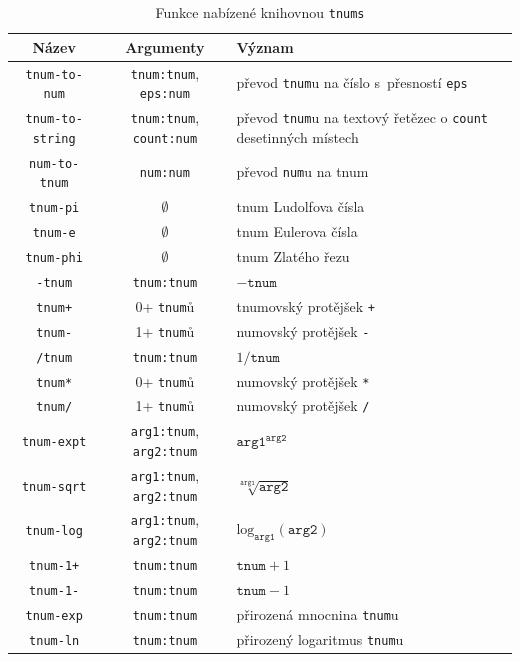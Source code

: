 \begin{table}[H]
\begin{mdframed}[backgroundcolor=lightpink,innertopmargin=-2.5pt,innerbottommargin=2.5pt]
\centering
\caption{Funkce nabízené knihovnou \texttt{tnums}}
\label{tab:funkce_rozhrani}
\begin{tabular}{| >{\columncolor[gray]{1}} c |>{\columncolor[gray]{1}}c|>{\columncolor[gray]{1}}p{4.8cm}|}
\hline
Název & Argumenty & Význam\\ \hline \hline
\texttt{tnum-to-num} & \texttt{tnum:tnum}, \texttt{eps:num} & převod \texttt{tnum}u na číslo s~přesností \texttt{eps}\\
\texttt{tnum-to-string} & \texttt{tnum:tnum}, \texttt{count:num} & převod \texttt{tnum}u na textový řetězec o \texttt{count} desetinných místech\\\hline
\texttt{num-to-tnum}&\texttt{num:num}&převod \texttt{num}u na tnum\\
\texttt{tnum-pi}&$\emptyset$&tnum Ludolfova čísla\\
\texttt{tnum-e}&$\emptyset$&tnum Eulerova čísla\\
\texttt{tnum-phi}&$\emptyset$&tnum Zlatého řezu\\\hline
\texttt{-tnum}&\texttt{tnum:tnum}&$-\texttt{tnum}$\\
\texttt{tnum+}&0+ \texttt{tnum}ů&tnumovský protějšek \texttt{+}\\
\texttt{tnum-}&1+ \texttt{tnum}ů&numovský protějšek \texttt{-}\\
\texttt{/tnum}&\texttt{tnum:tnum}&$1/\texttt{tnum}$\\
\texttt{tnum*}&0+ \texttt{tnum}ů&numovský protějšek \texttt{*}\\
\texttt{tnum/}&1+ \texttt{tnum}ů&numovský protějšek \texttt{/}\\
\texttt{tnum-expt}&\texttt{arg1:tnum}, \texttt{arg2:tnum}&$\texttt{arg1}^{\texttt{arg2}}$\\
\texttt{tnum-sqrt}&\texttt{arg1:tnum}, \texttt{arg2:tnum}&$\sqrt[\texttt{arg1}]{\texttt{arg2}}$\\
\texttt{tnum-log}&\texttt{arg1:tnum}, \texttt{arg2:tnum}&$\mathrm{log}_{\texttt{arg1}}(\texttt{arg2})$\\
\texttt{tnum-1+}&\texttt{tnum:tnum}&$\texttt{tnum} + 1$\\
\texttt{tnum-1-}&\texttt{tnum:tnum}&$\texttt{tnum} - 1$\\\hline
\texttt{tnum-exp}&\texttt{tnum:tnum}&přirozená mnocnina \texttt{tnum}u\\
\texttt{tnum-ln}&\texttt{tnum:tnum}&přirozený logaritmus \texttt{tnum}u\\

\end{tabular}
\end{mdframed}
\end{table}
